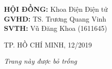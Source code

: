 \documentclass[12pt, a4paper, oneside]{book}
\newcommand{\csCouncil}{Khoa Điện Điện tử}
\newcommand{\csSupervise}{TS. Trương Quang Vinh}
\newcommand{\csReviewer}{TS. Nguyễn Văn A}
\newcommand{\csCompileTime}{12/2019}
\newcommand{\csSVone}{Vũ Đăng Khoa}
\newcommand{\csidSVone}{1611645}
\begin{document}
\begin{titlepage}
\begin{flushright}
    \begin{minipage}{0.6\textwidth}
        \large
        \textbf{HỘI ĐỒNG:} \csCouncil\\[0.1cm]
        \textbf{GVHD:} \csSupervise\\[0.1cm]
        \textbf{SVTH:} \csSVone{} (\csidSVone)
    \end{minipage}
\end{flushright}


\begin{center}
\vfill
{\fontsize{14}{1}\selectfont TP. HỒ CHÍ MINH, \csCompileTime}
\end{center}

\end{titlepage}
\restoregeometry

\thispagestyle{empty}
\clearpage
\begin{center}
\vspace*{3cm}
\large\emph{Trang này được bỏ trống}
\vspace*{\fill}
\end{center}
\addtocounter{page}{-1}
\end{document}
